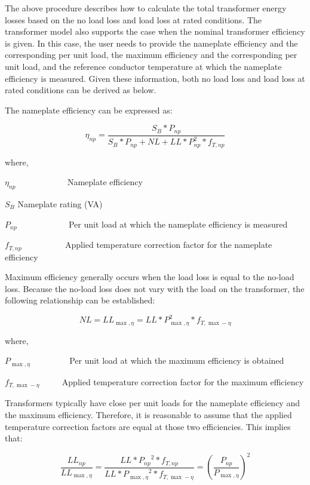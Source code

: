 The above procedure describes how to calculate the total transformer energy losses based on the no load loss and load loss at rated conditions. The transformer model also supports the case when the nominal transformer efficiency is given. In this case, the user needs to provide the nameplate efficiency and the corresponding per unit load, the maximum efficiency and the corresponding per unit load, and the reference conductor temperature at which the nameplate efficiency is measured. Given these information, both no load loss and load loss at rated conditions can be derived as below.

The nameplate efficiency can be expressed as:

\begin{equation}
{\eta_{np}} = \frac{{{S_B}*{P_{np}}}}{{{S_B}*{P_{np}} + NL + LL*P_{np}^2*{f_{T,np}}}}
\end{equation}

where,

\({\eta_{np}}\) ~~~~~~~~~~~ Nameplate efficiency

\({S_B}\) Nameplate rating (VA)

\({P_{np}}\) ~~~~~~~~~~~ Per unit load at which the nameplate efficiency is measured

\({f_{T,np}}\) ~~~~~~~~~ Applied temperature correction factor for the nameplate efficiency

Maximum efficiency generally occurs when the load loss is equal to the no-load loss. Because the no-load loss does not vary with the load on the transformer, the following relationship can be established:

\begin{equation}
NL = L{L_{\max ,\eta }} = LL*P_{\max ,\eta }^2*{f_{T,\max  - \eta }}
\end{equation}

where,

\({P_{\max ,\eta }}\) ~~~~~~~~ Per unit load at which the maximum efficiency is obtained

\({f_{T,\max - \eta }}\) ~~~~ Applied temperature correction factor for the maximum efficiency

Transformers typically have close per unit loads for the nameplate efficiency and the maximum efficiency. Therefore, it is reasonable to assume that the applied temperature correction factors are equal at those two efficiencies. This implies that:

\begin{equation}
\frac{{L{L_{np}}}}{{L{L_{\max ,\eta }}}} = \frac{{LL*{P_{np}}^2*{f_{T,np}}}}{{LL*{P_{\max ,\eta }}^2*{f_{T,\max  - \eta }}}} = {\left( {\frac{{{P_{np}}}}{{{P_{\max ,\eta }}}}} \right)^2}
\end{equation}


